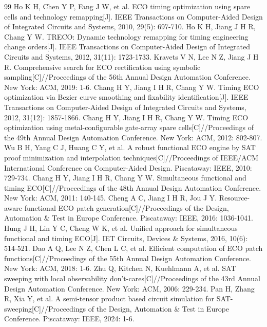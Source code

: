 \documentclass[twocolumn,10pt]{ctexart}
\begin{document}
\renewcommand{\refname}{参考文献}
\begin{thebibliography}{99}
 Ho K H, Chen Y P, Fang J W, et al. ECO timing optimization using spare cells and technology remapping[J]. IEEE Transactions on Computer-Aided Design of Integrated Circuits and Systems, 2010, 29(5): 697-710.
 Ho K H, Jiang J H R, Chang Y W. TRECO: Dynamic technology remapping for timing engineering change orders[J]. IEEE Transactions on Computer-Aided Design of Integrated Circuits and Systems, 2012, 31(11): 1723-1733.
 Kravets V N, Lee N Z, Jiang J H R. Comprehensive search for ECO rectification using symbolic sampling[C]//Proceedings of the 56th Annual Design Automation Conference. New York: ACM, 2019: 1-6.
 Chang H Y, Jiang I H R, Chang Y W. Timing ECO optimization via Bezier curve smoothing and fixability identification[J]. IEEE Transactions on Computer-Aided Design of Integrated Circuits and Systems, 2012, 31(12): 1857-1866.
 Chang H Y, Jiang I H R, Chang Y W. Timing ECO optimization using metal-configurable gate-array spare cells[C]//Proceedings of the 49th Annual Design Automation Conference. New York: ACM, 2012: 802-807.
 Wu B H, Yang C J, Huang C Y, et al. A robust functional ECO engine by SAT proof minimization and interpolation techniques[C]//Proceedings of IEEE/ACM International Conference on Computer-Aided Design. Piscataway: IEEE, 2010: 729-734.
 Chang H Y, Jiang I H R, Chang Y W. Simultaneous functional and timing ECO[C]//Proceedings of the 48th Annual Design Automation Conference. New York: ACM, 2011: 140-145.
 Cheng A C, Jiang I H R, Jou J Y. Resource-aware functional ECO patch generation[C]//Proceedings of the Design, Automation \& Test in Europe Conference. Piscataway: IEEE, 2016: 1036-1041.
 Hung J H, Lin Y C, Cheng W K, et al. Unified approach for simultaneous functional and timing ECO[J]. IET Circuits, Devices \& Systems, 2016, 10(6): 514-521.
 Dao A Q, Lee N Z, Chen L C, et al. Efficient computation of ECO patch functions[C]//Proceedings of the 55th Annual Design Automation Conference. New York: ACM, 2018: 1-6.
 Zhu Q, Kitchen N, Kuehlmann A, et al. SAT sweeping with local observability don't-cares[C]//Proceedings of the 43rd Annual Design Automation Conference. New York: ACM, 2006: 229-234.
 Pan H, Zhang R, Xia Y, et al. A semi-tensor product based circuit simulation for SAT-sweeping[C]//Proceedings of the Design, Automation \& Test in Europe Conference. Piscataway: IEEE, 2024: 1-6.

\end{thebibliography}
\end{document}
